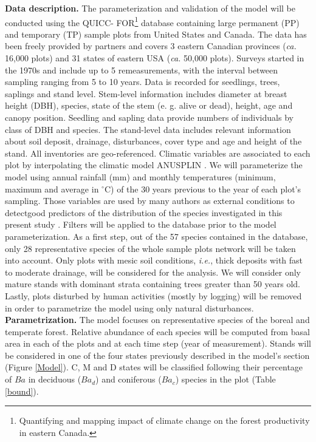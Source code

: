 \textbf{Data description.} The parameterization and validation of the model
will be conducted using the QUICC- FOR\footnote{Quantifying and mapping impact
of climate change on the forest productivity in eastern Canada.} database
containing large permanent (PP) and temporary (TP) sample plots from United
States and Canada. The data has been freely provided by partners and covers 3
eastern Canadian provinces (\textit{ca.} 16,000 plots) and 31 states of
eastern USA (\textit{ca.} 50,000 plots). Surveys started in the 1970s and
include up to 5 remeasurements, with the interval between sampling ranging
from 5 to 10 years. Data is recorded for seedlings, trees, saplings and stand
level. Stem-level information includes diameter at breast height (DBH),
species, state of the stem (e. g. alive or dead), height, age and canopy
position. Seedling and sapling data provide numbers of individuals by class of
DBH and species. The stand-level data includes relevant information about
soil deposit, drainage, disturbances, cover type and age and height of the
stand. All  inventories are geo-referenced. Climatic variables are associated to each plot by interpolating  the climatic
model ANUSPLIN \cite{McKenney2011} . We will parameterize the model using
annual rainfall (mm) and monthly temperatures (minimum, maximum and average in
\ensuremath{^\circ}C) of the 30 years previous to the year of each plot's sampling.
Those variables are used by many authors as external conditions to detectgood predictors of the distribution of
the species investigated in this present study
\cite{Goldblum2010,Hirota2011,Scheffer2012}. Filters will be applied to the
database prior to the model parameterization. As a first step, out of the 57
species contained in the database, only 28 representative species of the
whole sample plots network will be taken into account. Only plots with mesic
soil conditions, \textit{i.e.}, thick deposits with fast to moderate drainage,
will be considered for the analysis. We will consider only mature stands
with dominant strata containing trees greater than 50 years old. Lastly, plots
disturbed by human activities (mostly by logging) will be removed in order to
parametrize the model using only natural disturbances. \\

\textbf{Parametrization.} The model focuses on
representative species of the boreal and temperate forest. Relative 
abundance of each species will be computed from basal area in each of the plots and at each time step (year of measurement).
Stands will be considered in one of the four states previously described in
the model's section (Figure \ref{Model}). C, M and D states will be classified
following their percentage of $Ba$ in deciduous ($Ba_d$) and coniferous ($Ba_c$)
species in the plot (Table \ref{bound}). 

